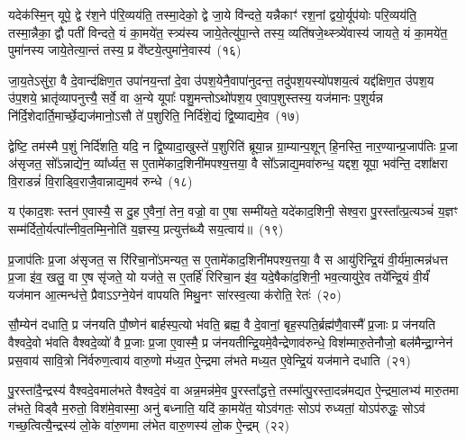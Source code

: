 यदेक॑स्मि॒न् यूपे॒ द्वे र॑श॒ने प॑रि॒व्यय॑ति॒ तस्मा॒देको॒ द्वे जा॒ये वि॑न्दते॒ यन्नैकाꣳ॑ रश॒नां द्वयो॒र्यूप॑योः परि॒व्यय॑ति॒ तस्मा॒न्नैका॒ द्वौ पती॑ विन्दते॒ यं का॒मये॑त॒ स्त्र्य॑स्य जाये॒तेत्यु॑पा॒न्ते तस्य॒ व्यति॑षजे॒थ्स्त्र्ये॑वास्य॑ जायते॒ यं का॒मये॑त॒ पुमा॑नस्य जाये॒तेत्या॒न्तं तस्य॒ प्र वे᳚ष्टये॒त्पुमा॑ने॒वास्य॑~(१६)

जा॒य॒ते\-ऽसु॑रा॒ वै दे॒वान्द॑क्षिण॒त उपा॑नय॒न्तां दे॒वा उ॑पश॒येनै॒वापा॑नुदन्त॒ तदु॑पश॒यस्यो॑पशय॒त्वं यद्द॑क्षिण॒त उ॑पश॒य उ॑प॒शये॒ भ्रातृ॑व्यापनुत्त्यै॒ सर्वे॒ वा अ॒न्ये यूपाः᳚ पशु॒मन्तो\-ऽथो॑पश॒य ए॒वाप॒शुस्तस्य॒ यज॑मानः प॒शुर्यन्न नि॑र्दि॒शेदार्ति॒\-मार्च्छे॒द्यज॑मानो॒\-ऽसौ ते॑ प॒शुरिति॒ निर्दि॑शे॒द्यं द्वि॒ष्याद्यमे॒व~(१७)

द्वेष्टि॒ तम॑स्मै प॒शुं निर्दि॑शति॒ यदि॒ न द्वि॒ष्यादा॒खुस्ते॑ प॒शुरिति॑ ब्रूया॒न्न ग्रा॒म्यान्प॒शून् हि॒नस्ति॒ नार॒ण्यान्प्र॒जा\-प॑तिः प्र॒जा अ॑सृजत॒ सो᳚\-ऽन्नाद्ये॑न॒ व्या᳚र्ध्यत॒ स ए॒तामे॑काद॒शिनी॑मपश्य॒त्तया॒ वै सो᳚\-ऽन्नाद्य॒मवा॑रुन्ध॒ यद्दश॒ यूपा॒ भव॑न्ति॒ दशा᳚क्षरा वि॒राडन्नं॑ वि॒राड्वि॒राजै॒वान्नाद्य॒मव॑ रुन्धे~(१८)

य ए॑काद॒शः स्तन॑ ए॒वास्यै॒ स दु॒ह ए॒वैनां॒ तेन॒ वज्रो॒ वा ए॒षा सम्मी॑यते॒ यदे॑काद॒शिनी॒ सेश्व॒रा पु॒रस्ता᳚त्प्र॒त्यञ्चं॑ य॒ज्ञꣳ सम्म॑र्दितो॒र्यत्पा᳚त्नीव॒तम्मि॒नोति॑ य॒ज्ञस्य॒ प्रत्युत्त॑ब्ध्यै सय॒त्वाय॑॥~(१९)

{\anuvakamend[{वै सम॑ष्ट्यै॒ पुमा॑ने॒वास्य॒ यमे॒व रु॑न्धे त्रि॒ꣳ॒शच्च॑}]}%

प्र॒जा\-प॑तिः प्र॒जा अ॑सृजत॒ स रि॑रिचा॒नो॑\-ऽमन्यत॒ स ए॒तामे॑काद॒शिनी॑मपश्य॒त्तया॒ वै स आयु॑रिन्द्रि॒यं वी॒र्य॑मा॒त्मन्न॑धत्त प्र॒जा इ॑व॒ खलु॒ वा ए॒ष सृ॑जते॒ यो यज॑ते॒ स ए॒तर्\mbox{}हि॑ रिरिचा॒न इ॑व॒ यदे॒षैका॑द॒शिनी॒ भव॒त्यायु॑रे॒व तये᳚न्द्रि॒यं वी॒र्यं॑ यज॑मान आ॒त्मन्ध॑त्ते॒ प्रैवाऽऽग्ने॒येन॑ वापयति मिथु॒नꣳ सा॑रस्व॒त्या क॑रोति॒ रेतः॑~(२०)

सौ॒म्येन॑ दधाति॒ प्र ज॑नयति पौ॒ष्णेन॑ बार्\mbox{}हस्प॒त्यो भ॑वति॒ ब्रह्म॒ वै दे॒वानां॒ बृह॒स्पति॒र्ब्रह्म॑णै॒वास्मै᳚ प्र॒जाः प्र ज॑नयति वैश्वदे॒वो भ॑वति वैश्वदे॒व्यो॑ वै प्र॒जाः प्र॒जा ए॒वास्मै॒ प्र ज॑नयतीन्द्रि॒यमे॒वैन्द्रेणाव॑रुन्धे॒ विश॑म्मारु॒तेनौजो॒ बल॑मैन्द्रा॒ग्नेन॑ प्रस॒वाय॑ सावि॒त्रो नि॑र्वरुण॒त्वाय॑ वारु॒णो म॑ध्य॒त ऐ॒न्द्रमा ल॑भते मध्य॒त ए॒वेन्द्रि॒यं यज॑माने दधाति~(२१)

पु॒रस्ता॑दै॒न्द्रस्य॑ वैश्वदे॒वमाल॑भते वैश्वदे॒वं वा अन्न॒मन्न॑मे॒व पु॒रस्ता᳚द्धत्ते॒ तस्मा᳚त्पु॒रस्ता॒दन्न॑मद्यत ऐ॒न्द्रमा॒लभ्य॑ मारु॒तमा ल॑भते॒ विड्वै म॒रुतो॒ विश॑मे॒वास्मा॒ अनु॑ बध्नाति॒ यदि॑ का॒मये॑त॒ यो\-ऽव॑गतः॒ सो\-ऽप॑ रुध्यतां॒ यो\-ऽप॑रुद्धः॒ सो\-ऽव॑ गच्छ॒त्वित्यै॒न्द्रस्य॑ लो॒के वा॑रु॒णमा ल॑भेत वारु॒णस्य॑ लो॒क ऐ॒न्द्रम्~(२२)

